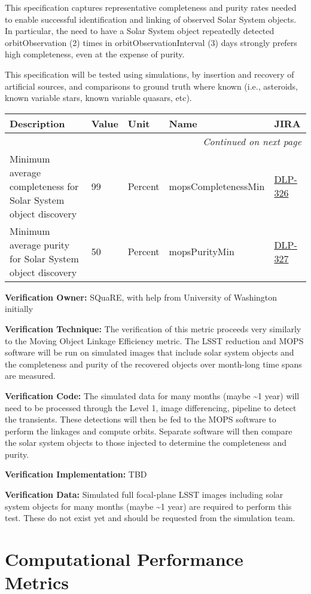 \documentclass[DM,lsstdraft,toc]{lsstdoc}
\makeatletter
\newcommand{\jira}[1]{\href{https://jira.lsstcorp.org/browse/#1}{#1}}
\newenvironment{metric}[0]{%
\setlength\LTleft{0pt}
\setlength\LTright{\fill}
\begin{longtable}[]{@{}p{0.4\textwidth}lp{0.75in}p{1.3in}p{0.75in}@{}}

\hline \textbf{Description} & \textbf{Value} & \textbf{Unit} & \textbf{Name} & \textbf{JIRA} \\ \hline
\endhead

\hline \multicolumn{5}{r}{\emph{Continued on next page}} \\
\endfoot

\hline\hline
\endlastfoot
}{%
\hline
\end{longtable}
}
\makeatother
\begin{document}
This specification captures representative completeness and purity rates
needed to enable successful identification and linking of observed Solar
System objects. In particular, the need to have a Solar System object
repeatedly detected orbitObservation (2) times in
orbitObservationInterval (3) days strongly prefers high completeness,
even at the expense of purity.

This specification will be tested using simulations, by insertion and
recovery of artificial sources, and comparisons to ground truth where
known (i.e., asteroids, known variable stars, known variable quasars,
etc).

\begin{metric}
Minimum average completeness for Solar System object discovery & 99 &
Percent & mops\-Completeness\-Min & \jira{DLP-326}\tabularnewline
Minimum average purity for Solar System object discovery & 50 & Percent
& mopsPurityMin & \jira{DLP-327}\tabularnewline
\end{metric}

\textbf{Verification Owner:} SQuaRE, with help from University of
Washington initially

\textbf{Verification Technique:} The verification of this metric
proceeds very similarly to the Moving Object Linkage Efficiency metric.
The LSST reduction and MOPS software will be run on simulated images
that include solar system objects and the completeness and purity of the
recovered objects over month-long time spans are measured.

\textbf{Verification Code:} The simulated data for many months (maybe
\textasciitilde{}1 year) will need to be processed through the Level 1,
image differencing, pipeline to detect the transients. These detections
will then be fed to the MOPS software to perform the linkages and
compute orbits. Separate software will then compare the solar system
objects to those injected to determine the completeness and purity.

\textbf{Verification Implementation:} TBD

\textbf{Verification Data:} Simulated full focal-plane LSST images
including solar system objects for many months (maybe \textasciitilde{}1
year) are required to perform this test. These do not exist yet and
should be requested from the simulation team.

\section{Computational Performance
Metrics}\label{computational-performance-metrics}
\end{document}
